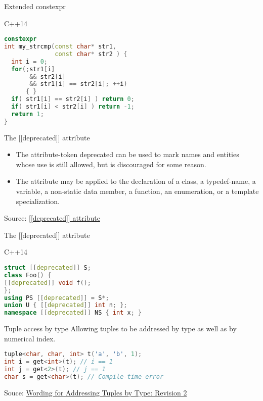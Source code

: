 \documentclass{beamer}
\begin{document}
\begin{frame}[fragile]{Extended constexpr}
\begin{block}{C++14}
\begin{lstlisting}[firstnumber=1, label=glabels, xleftmargin=5pt, language=C++] 
constexpr 
int my_strcmp(const char* str1, 
              const char* str2 ) {
  int i = 0;
  for(;str1[i] 
       && str2[i] 
       && str1[i] == str2[i]; ++i)
      { }
  if( str1[i] == str2[i] ) return 0;
  if( str1[i] < str2[i] ) return -1;
  return 1;
}
\end{lstlisting}
\end{block}
\end{frame}

\begin{frame}{The [[deprecated]] attribute}
\begin{itemize}

\item The attribute-token deprecated can be used to mark names and entities whose use is still allowed, but is discouraged for some reason.

\item The attribute may be applied to the declaration of a class, a typedef-name, a variable, a non-static data member, a function, an enumeration, or a template specialization.
\end{itemize}

\vfill
Source: \href{http://www.open-std.org/jtc1/sc22/wg21/docs/papers/2013/n3760.html}{[[deprecated]] attribute}

\end{frame}

\begin{frame}[fragile]{The [[deprecated]] attribute}
\begin{block}{C++14}
\begin{lstlisting}[firstnumber=1, label=glabels, xleftmargin=5pt, language=C++] 
struct [[deprecated]] S;
class Foo() {
[[deprecated]] void f();
};
using PS [[deprecated]] = S*;
union U { [[deprecated]] int n; };
namespace [[deprecated]] NS { int x; }
\end{lstlisting}
\end{block}
\end{frame}

\begin{frame}[fragile]{Tuple access by type}
Allowing tuples to be addressed by type as well as by numerical index.

\begin{lstlisting}[firstnumber=1, label=glabels, xleftmargin=5pt, language=C++] 
tuple<char, char, int> t('a', 'b', 1);
int i = get<int>(t); // i == 1
int j = get<2>(t); // j == 1
char s = get<char>(t); // Compile-time error
\end{lstlisting}

\vfill
Souce: \href{http://www.open-std.org/jtc1/sc22/wg21/docs/papers/2013/n3670.html}{Wording for Addressing Tuples by Type: Revision 2} 
\end{frame}
\end{document}
